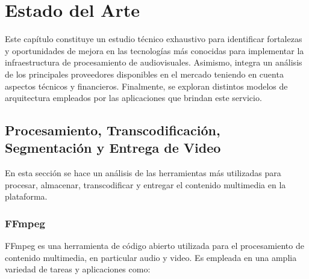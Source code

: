 \chapter{Estado del Arte}

Este capítulo constituye un estudio técnico exhaustivo para identificar fortalezas y oportunidades de mejora en las tecnologías más conocidas para implementar la infraestructura de procesamiento de audiovisuales. Asimismo, integra un análisis de los principales proveedores disponibles en el mercado teniendo en cuenta aspectos técnicos y financieros. Finalmente, se exploran distintos modelos de arquitectura empleados por las aplicaciones que brindan este servicio. 


\section{Procesamiento, Transcodificación, Segmentación y Entrega de Video}

\label{2.1}


En esta sección se hace un análisis de las herramientas más utilizadas para procesar, almacenar, transcodificar y entregar el contenido multimedia en la plataforma. 



\subsection{FFmpeg}
\label{ffmpeg}


FFmpeg es una herramienta de código abierto utilizada para el procesamiento de contenido multimedia, en particular audio y video. Es empleada en una amplia variedad de tareas y aplicaciones como:



